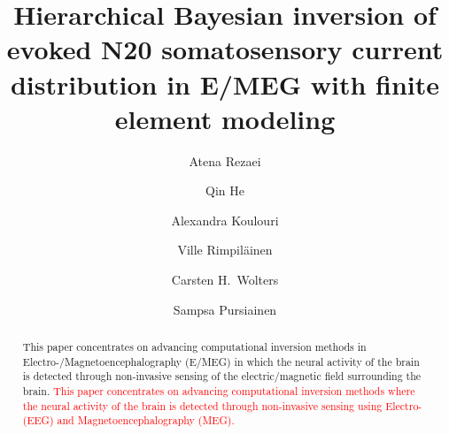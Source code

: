 \documentclass[5p]{elsarticle}
\begin{document}
\begin{frontmatter}
\title{Hierarchical Bayesian inversion of evoked N20 somatosensory current distribution in E/MEG with finite element modeling}

\author[ADD1]{Atena Rezaei}
\author[ADD1,ADD2]{Qin He}
\author[ADD1,ADD4]{Alexandra Koulouri}
\author[ADD1,ADD5]{Ville Rimpil\"{a}inen}
\author[ADD3]{Carsten H.\ Wolters}
\author[ADD1]{Sampsa Pursiainen}
\address[ADD1]{Laboratory of Mathematics, Tampere University of Technology, P.O.\ Box 692, 33101 Tampere, Finland}
\address[ADD2]{Laboratory of Signal Processing, Tampere University of Technology, Tampere, Finland, P.O.\ Box 553, 33101 Tampere, Finland}
\address[ADD4]{Department of Physics, Aristotle University of Thessaloniki, Thessaloniki 541 24, Greece}
\address[ADD5]{Department of Physics, University of Bath, Claverton Down, BA2 7AY Bath, United Kingdom}
\address[ADD3]{Institute for Biomagnetism and Biosignalanalysis, University of M\"{u}nster, Germany, Malmedyweg 15, D-48149 M\"{u}nster, Germany} 

\begin{abstract}
This paper concentrates on advancing computational inversion methods in Elect\-ro-/Mag\-ne\-to\-ence\-phalo\-graphy (E/MEG) in which the neural activity of the brain is detected through non-invasive sensing of the electric/magnetic field surrounding the brain.
\textcolor{red}{ This paper concentrates on advancing computational inversion methods where the neural activity of the brain is detected through non-invasive sensing using Elect\-ro- (EEG) and Mag\-ne\-to\-ence\-phalo\-graphy (MEG).}


\end{abstract}
\end{frontmatter}
\end{document}
